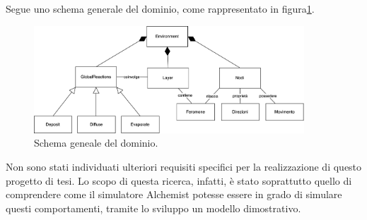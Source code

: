 Segue uno schema generale del dominio, come rappresentato in figura\space\ref{fig:generale}.
\begin{figure}[ht]
    \centering
    \includegraphics[width=0.9\textwidth]{figures/generale.png}
    \caption{Schema geneale del dominio.}\label{fig:generale}
\end{figure}\newline

Non sono stati individuati ulteriori requisiti specifici per la realizzazione di questo progetto di tesi.
Lo scopo di questa ricerca, infatti, è stato soprattutto quello di comprendere come il simulatore Alchemist 
potesse essere in grado di simulare questi comportamenti, tramite lo sviluppo un modello
dimostrativo.